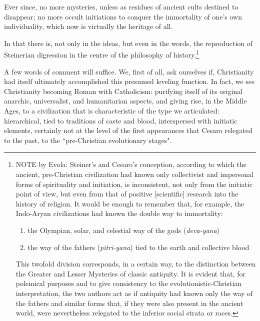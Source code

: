 \begin{quotex}
Ever since, no more mysteries, unless as residues of ancient cults destined to disappear; no more occult initiations to conquer the immortality of one's own individuality, which now is virtually the heritage of all.

\end{quotex}
In that there is, not only in the ideas, but even in the words, the reproduction of Steinerian digression in the centre of the philosophy of history.\footnote{
NOTE by Evola: Steiner's and Cesaro's conception, according to which the ancient, pre-Christian civilization had known only collectivist and impersonal forms of spirituality and initiation, is inconsistent, not only from the initiatic point of view, but even from that of positive [scientific] research into the history of religion. It would be enough to remember that, for example, the Indo-Aryan civilizations had known the double way to immortality:

\begin{enumerate}
\item the Olympian, solar, and celestial way of the gods (\emph{deva-yana}) 
\item the way of the fathers (\emph{pitri-yana}) tied to the earth and collective blood 
\end{enumerate}
This twofold division corresponds, in a certain way, to the distinction between the Greater and Lesser Mysteries of classic antiquity. It is evident that, for polemical purposes and to give consistency to the evolutionistic-Christian interpretation, the two authors act as if antiquity had known only the way of the fathers and similar forms that, if they were also present in the ancient world, were nevertheless relegated to the inferior social strata or races.}

A few words of comment will suffice. We, first of all, ask ourselves if, Christianity had itself ultimately accomplished this presumed leveling function. In fact, we see Christianity becoming Roman with Catholicism: purifying itself of its original anarchic, universalist, and humanitarian aspects, and giving rise, in the Middle Ages, to a civilization that is characteristic of the type we articulated: hierarchical, tied to traditions of caste and blood, interspersed with initiatic elements, certainly not at the level of the first appearances that Cesaro relegated to the past, to the ``pre-Christian evolutionary stages".

